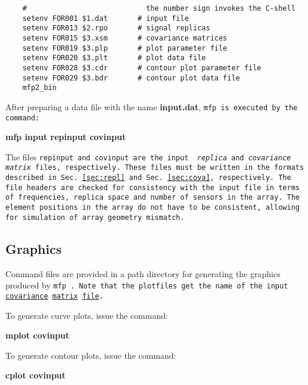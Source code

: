 \small
\begin{verbatim}
    #                            the number sign invokes the C-shell 
    setenv FOR001 $1.dat       # input file 
    setenv FOR013 $2.rpo       # signal replicas
    setenv FOR015 $3.xsm       # covariance matrices
    setenv FOR019 $3.plp       # plot parameter file
    setenv FOR020 $3.plt       # plot data file  
    setenv FOR028 $3.cdr       # contour plot parameter file 
    setenv FOR029 $3.bdr       # contour plot data file 
    mfp2_bin
\end{verbatim}
\normalsize

    After preparing a data file with the name {\bf input.dat}, \tt mfp \rm  is 
executed by the command:

{\bf    mfp input repinput covinput}

The files \tt repinput \rm and \tt covinput \rm are the input {\em
replica} and {\em covariance matrix} files, respectively. These files
must be written in  the formats described in Sec.~\ref{sec:repl}
and Sec.~\ref{sec:cova}, respectively. The file headers are checked
for consistency with the input file in terms of frequencies, replica
space and number of sensors in the array. The element positions in the
array do not have to be consistent, allowing for simulation of array
geometry mismatch.
  
\subsection{Graphics}  

    Command files are provided in a path directory for generating 
the graphics produced by \tt mfp \rm. Note that the plotfiles get the name of the input \underline{covariance} \underline{matrix} \underline{file}.

\noindent    To generate curve plots, issue the command:

    {\bf mplot covinput}


\noindent    To generate contour plots, issue the command:

     {\bf cplot covinput}
 
